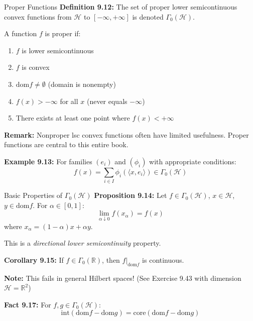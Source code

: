 \documentclass[aspectratio=169,10pt]{beamer}
\begin{document}
\begin{frame}{Proper Functions}
\textbf{Definition 9.12:} The set of \alert{proper lower semicontinuous convex functions} from $\mathcal{H}$ to $[-\infty, +\infty]$ is denoted $\Gamma_0(\mathcal{H})$.

\vspace{0.3cm}
A function $f$ is proper if:
\begin{enumerate}
    \item $f$ is lower semicontinuous
    \item $f$ is convex
    \item $\text{dom} f \neq \emptyset$ (domain is nonempty)
    \item $f(x) > -\infty$ for all $x$ (never equals $-\infty$)
    \item There exists at least one point where $f(x) < +\infty$
\end{enumerate}

\vspace{0.3cm}
\textbf{Remark:} Nonproper lsc convex functions often have limited usefulness. Proper functions are central to this entire book.

\vspace{0.3cm}
\textbf{Example 9.13:} For families $(e_i)$ and $(\phi_i)$ with appropriate conditions:
\[
f(x) = \sum_{i \in I} \phi_i(\langle x, e_i \rangle) \in \Gamma_0(\mathcal{H})
\]
\end{frame}

\begin{frame}{Basic Properties of $\Gamma_0(\mathcal{H})$}
\textbf{Proposition 9.14:} Let $f \in \Gamma_0(\mathcal{H})$, $x \in \mathcal{H}$, $y \in \text{dom} f$. For $\alpha \in [0,1]$:
\[
\lim_{\alpha \downarrow 0} f(x_\alpha) = f(x)
\]
where $x_\alpha = (1-\alpha)x + \alpha y$.

\vspace{0.3cm}
This is a \emph{directional lower semicontinuity} property.

\vspace{0.3cm}
\textbf{Corollary 9.15:} If $f \in \Gamma_0(\mathbb{R})$, then $f|_{\text{dom} f}$ is continuous.

\vspace{0.3cm}
\textbf{Note:} This fails in general Hilbert spaces! (See Exercise 9.43 with dimension $\mathcal{H} = \mathbb{R}^2$)

\vspace{0.3cm}
\textbf{Fact 9.17:} For $f, g \in \Gamma_0(\mathcal{H})$:
\[
\text{int}(\text{dom} f - \text{dom} g) = \text{core}(\text{dom} f - \text{dom} g)
\]
\end{frame}
\end{document}
